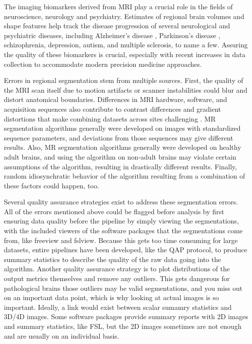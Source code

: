 The imaging biomarkers derived from MRI play a crucial role in the fields of neuroscience, neurology and psychiatry. Estimates of regional brain volumes and shape features help track the disease progression of several neurological and psychiatric diseases, including Alzheimer's disease \cite{Vemuri_2010}, Parkinson's disease \cite{Silvia_Mangia_2013}, schizophrenia\cite{shenton2001review}, depression\cite{meisenzahl2011structural}, autism\cite{brambilla2003brain}, and multiple sclerosis\cite{Filippi_1995}, to name a few. Assuring the quality of these biomarkers is crucial, especially with recent increases in data collection to accommodate modern precision medicine approaches. 

Errors in regional segmentation stem from multiple sources. First, the quality of the MRI scan itself due to motion artifacts or scanner instabilities could blur and distort anatomical boundaries. Differences in MRI hardware, software, and acquisition sequences also contribute to contrast differences and gradient distortions that make combining datasets across sites challenging \cite{keshavan2016power}. MR segmentation algorithms generally were developed on images with standardized sequence parameters, and deviations from those sequences may give different results. Also, MR segmentation algorithms generally were developed on healthy adult brains, and using the algorithm on non-adult brains may violate certain assumptions of the algorithm, resulting in drastically different results. Finally, random idiosynchratic behavior of the algorithm resulting from a combination of these factors could happen, too.

Several quality assurance strategies exist to address these segmentation errors. All of the errors mentioned above could be flagged before analysis by first ensuring data quality before the pipeline by simply viewing the segmentations, with the included viewers of the software packages that the segmentations come from, like freeview and fslview. Because this gets too time consuming for large datasets, entire pipelines have been developed, like the QAP protocol, to produce summary statistics to describe the quality of the raw data going into the algorithm. Another quality assurance strategy is to plot distributions of the output metrics themselves and remove any outliers. This gets dangerous for pathological brains those outliers may be valid segmentations, and you miss out on an important data point, which is why looking at actual images is so important. Ideally, a link would exist between scalar sumamry statistics and 3D/4D images. Some software packages provide summary reports with 2D images and summary statistics, like FSL, but the 2D images sometimes are not enough and are usually on an individual basis. 

